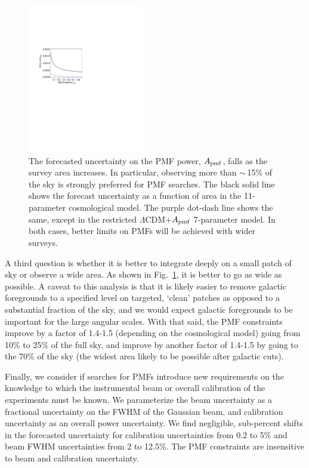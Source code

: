 \documentclass[preprint]{emulateapj}
\newcommand{\apmf}{\ensuremath{A_{\rm pmf}}}
\newcommand{\lcdm}{\ensuremath{\Lambda}CDM}
\begin{document}
\begin{figure}[htb]\centering
\includegraphics[width=0.45\textwidth,clip,trim={1.5cm 12.5cm 11cm 7.5cm}]{pmf_area.pdf}
  \caption[Area dependence]{
  The forecasted uncertainty on the PMF power, \apmf{}, falls as the survey area increases. 
  In particular, observing more than $\sim$\,15\% of the sky is strongly preferred for PMF searches. 
  The black solid line shows the forecast uncertainty as a function of area in the 11-parameter cosmological model.
  The purple dot-dash line shows the same, except in the restricted \lcdm{}+\apmf{} 7-parameter model. 
  In both cases, better limits on PMFs will be achieved with wider surveys.
    \label{fig:area}
  }
\end{figure}
A third question is whether it is better to integrate deeply on a small patch of sky or observe a wide area. 
As shown in  Fig.~\ref{fig:area}, it is better to go as wide as possible. 
A caveat to this analysis is that it is likely easier to remove galactic foregrounds to a specified level on targeted, `clean' patches as opposed to a substantial fraction of the sky, and we would expect galactic foregrounds to be important for the large angular scales. 
With that said, the PMF constraints improve by a factor of 1.4-1.5 (depending on the cosmological model) going from 10\% to 25\% of the full sky, and improve by another factor of 1.4-1.5 by going to the 70\% of the sky (the widest area likely to be possible after galactic cuts).


Finally, we consider if searches for PMFs introduce new requirements on the knowledge to which the instrumental beam or overall calibration of the experiments must be known. 
We parameterize the beam uncertainty as a fractional uncertainty on the FWHM of the Gaussian beam, and calibration uncertainty as an overall power uncertainty. 
We find negligible, sub-percent shifts in the forecasted uncertainty for calibration uncertainties from 0.2 to 5\% and beam FWHM uncertainties from 2 to 12.5\%. 
The PMF constraints are insensitive to beam and calibration uncertainty. 
\end{document}
